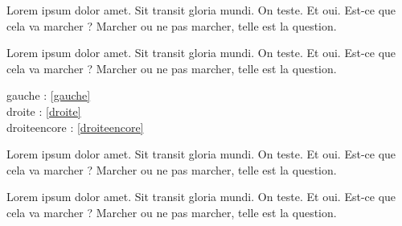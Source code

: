 \documentclass[twoside]{book}
\begin{document}
\begin{pairs}
\begin{Leftside}
\beginnumbering
\pstart
Lorem ipsum dolor amet. Sit transit gloria mundi.
On teste. Et oui. Est-ce que cela va marcher ? Marcher ou ne pas marcher, telle est la question.
\pend
\endnumbering
\end{Leftside}

\begin{Rightside}
\beginnumbering
\pstart
Lorem ipsum dolor amet. Sit transit gloria mundi.
On teste. Et oui. Est-ce que cela va marcher ? Marcher ou ne pas marcher, telle est la question.
\pend
\endnumbering
\end{Rightside}
\end{pairs}

\Columns

gauche : \ref{gauche}\\
droite : \ref{droite}\\
droiteencore : \ref{droiteencore}
\begin{pairs}
\begin{Leftside}
\beginnumbering
\pstart
Lorem ipsum dolor amet. Sit transit gloria mundi.
On teste. Et oui. Est-ce que cela va marcher ? Marcher ou ne pas marcher, telle est la question.
\pend
\endnumbering
\end{Leftside}

\begin{Rightside}
\beginnumbering
\pstart
Lorem ipsum dolor amet. Sit transit gloria mundi.
On teste. Et oui. Est-ce que cela va marcher ? Marcher ou ne pas marcher, telle est la question.
\pend
\endnumbering
\end{Rightside}
\end{pairs}
\Columns
\end{document}
